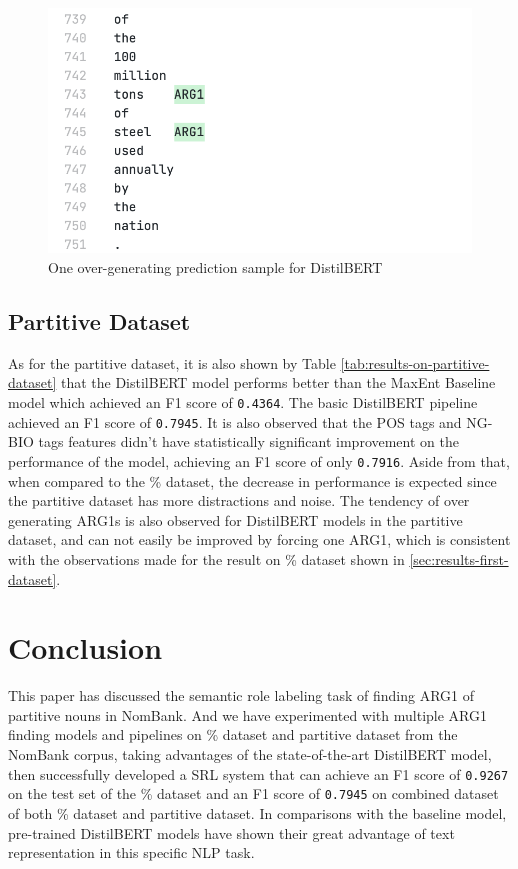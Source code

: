 \documentclass[11pt]{article}
\begin{document}
\begin{figure}[h]
  \centering
  \includegraphics[width=\linewidth]{assets/prediction-one-sample.png}
  \caption{One over-generating prediction sample for DistilBERT}
  \label{fig:prediction-one-sample}
\end{figure}

\subsection{Partitive Dataset}

As for the partitive dataset, it is also shown by Table \ref{tab:results-on-partitive-dataset} that the DistilBERT model performs better than the MaxEnt Baseline model which achieved an F1 score of \verb|0.4364|. The basic DistilBERT pipeline achieved an F1 score of  \verb|0.7945|. It is also observed that the POS tags and NG-BIO tags features didn't have statistically significant improvement on the performance of the model, achieving an F1 score of only \verb|0.7916|. Aside from that, when compared to the \% dataset, the decrease in performance is expected since the partitive dataset has more distractions and noise. The tendency of over generating ARG1s is also observed for DistilBERT models in the partitive dataset, and can not easily be improved by forcing one ARG1, which is consistent with the observations made for the result on \% dataset shown in \ref{sec:results-first-dataset}.

\section{Conclusion}

This paper has discussed the semantic role labeling task of finding ARG1 of partitive nouns in NomBank. And we have experimented with multiple ARG1 finding models and pipelines on \% dataset and partitive dataset from the NomBank corpus, taking advantages of the state-of-the-art DistilBERT model, then successfully developed a SRL system that can achieve an F1 score of \verb|0.9267| on the test set of the \% dataset and an F1 score of \verb|0.7945| on combined dataset of both \% dataset and partitive dataset. In comparisons with the baseline model, pre-trained DistilBERT models have shown their great advantage of text representation in this specific NLP task.
\end{document}
